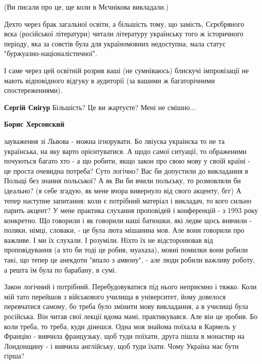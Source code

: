 \begin{itemize}
\begin{itemize}
(Ви писали про це, ще коли в Мєчнікова викладали.)

Дехто через брак загальної освіти, а більшість тому, що замість, Сєрєбряного
вєка (російської літератури) читали літературу українську того ж історичного
періоду, яка за совєтів була для україномовних недоступна, мала статус
"буржуазно-націоналістичної".

І саме через цей освітній розрив ваші (не сумніваюсь) блискучі імпровізації не
мають відповідного відгуку в аудиторії (за вашими ж багаторічними
спостереженнями).

 
\textbf{Сергій Снігур} Більшість? Це ви жартуєте? Мені не смішно...

 
\textbf{Борис Херсонский} 

зауваження зі Львова - можна ігнорувати. Бо лвіуска украінска то не та
українська, на яку варто орієнтуватися. А щодо самої ситуації, то ображеними
почуються багато хто - а що робити, якщо закон про свою мову у своїй країні -
це проста очевидна потреба? Суто логічно? Вас би допустили до викладання в
Польщі без знання польської? А як Ви би вчили польську, то розмовляли би
ідеально? (я себе згадую, як мене вчора вивернуло від свого акценту, бгг) А
тепер наступне запитання: коли є потрібний матеріал і викладач, то кого сильно
парить акцент? У мене практика слухання проповідей і конференцій - з 1993 року
конкретно. Що говорили і як говорили наші батюшки, які ледве щось вивчили -
поляки, німці, словаки, - це була люта мішанина мов. Але вони говорили про
важливе. І ми їх слухали. І розуміли. Ніхто їх не відсторонював від
проповідування (а хто би тоді це робив, муахаха), мовні помилки вони робили
такі, що тепер це анекдоти "впало з амвону", - але люди робили важливу роботу,
а решта їм була по барабану, в сумі.

Закон логічний і потрібний. Перебудовуватися під нього неприємно і тяжко. Коли
мій тато перейшов з військового училища в університет, йому довелося
перевчатися самому, бо треба було змінити мову викладання, а в училищі була
російська. Він читав свої лекції вдома мамі, практикувався. Але він це зробив.
Бо коли треба, то треба, куди дінешся. Одна моя знайома поїхала в Кармель у
Францію - вивчила французьку, щоб туди поїхати, друга пішла в монастир на
Лондонщину - і вивчила англійську, щоб туди їхати. Чому Україна має бути гірша?


\end{itemize}
\end{itemize}
